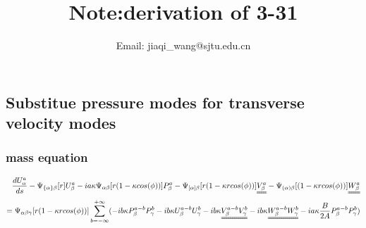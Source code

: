 \documentclass{Note}
\begin{document}
\title{Note:derivation of 3-31} 
\author{
     Email: jiaqi\_wang@sjtu.edu.cn
    } 

\maketitle



\subsection{Substitue pressure modes for transverse velocity modes}
\subsubsection{mass equation}
\begin{equation}
\begin{aligned}
{d U_\alpha^a \over d s}-\Psi_{\{\alpha\}\beta}[r]U_\beta^a-ia \kappa \Psi_{\alpha\beta}[r(1-\kappa cos(\phi))] P_\beta^a -\Psi_{[\alpha]\beta}[ r(1-\kappa r cos(\phi))]\uuline{V_\beta^a}-\Psi_{(\alpha)\beta}[ (1-\kappa r cos(\phi))]\uuline{W_\beta^a}\\
=\Psi_{\alpha\beta\gamma}[r(1-\kappa r cos(\phi))] \sum_{b=-\infty}^{+\infty}(-ib\kappa P_\beta^{a-b} P_\gamma^{b}-ib\kappa U_\beta^{a-b} U_\gamma^{b}-ib\kappa \uuline{V_\beta^{a-b} V_\gamma^{b}}-ib\kappa \uuline{ W_\beta^{a-b} W_\gamma^{b}}-ia\kappa  {B\over {2A}}P_\beta^{a-b}P_\gamma^{b})\\
\end{aligned}
\end{equation}
\end{document}
